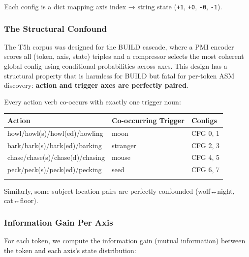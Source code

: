 \documentclass[
  twocolumn,
  10pt,
  a4paper]{article}
\newenvironment{tsxtable}{\begin{center}\footnotesize}{\end{center}}
\let\endhead\relax
\begin{document}
Each config is a dict mapping axis index → string state
(\texttt{\textquotesingle{}+1\textquotesingle{}},
\texttt{\textquotesingle{}+0\textquotesingle{}},
\texttt{\textquotesingle{}-0\textquotesingle{}},
\texttt{\textquotesingle{}-1\textquotesingle{}}).

\hypertarget{the-structural-confound}{%
\subsubsection{The Structural Confound}\label{the-structural-confound}}

The T5h corpus was designed for the BUILD cascade, where a PMI encoder
scores all (token, axis, state) triples and a compressor selects the
most coherent global config using conditional probabilities across axes.
This design has a structural property that is harmless for BUILD but
fatal for per-token ASM discovery: \textbf{action and trigger axes are
perfectly paired}.

Every action verb co-occurs with exactly one trigger noun:

\begin{tsxtable}\begin{tabularx}{\linewidth}{@{}YYY@{}}
\toprule\noalign{}
Action & Co-occurring Trigger & Configs \\
\midrule\noalign{}
\endhead
howl/howl(s)/howl(ed)/howling & moon & CFG 0, 1 \\
bark/bark(s)/bark(ed)/barking & stranger & CFG 2, 3 \\
chase/chase(s)/chase(d)/chasing & mouse & CFG 4, 5 \\
peck/peck(s)/peck(ed)/pecking & seed & CFG 6, 7 \\
\bottomrule\noalign{}
\end{tabularx}\end{tsxtable}

Similarly, some subject-location pairs are perfectly confounded
(wolf↔night, cat↔floor).

\hypertarget{information-gain-per-axis}{%
\subsubsection{Information Gain Per
Axis}\label{information-gain-per-axis}}

For each token, we compute the information gain (mutual information)
between the token and each axis's state distribution:
\end{document}
